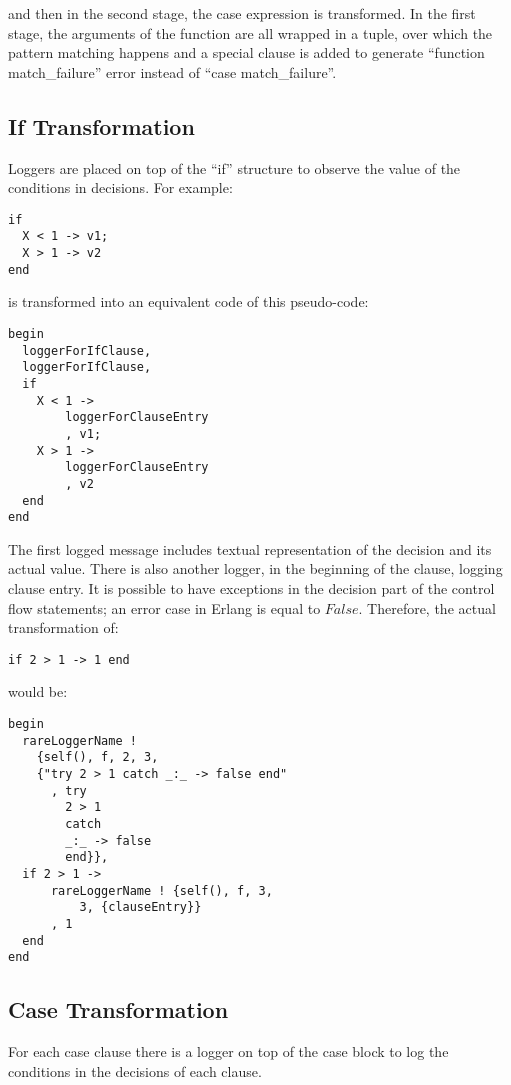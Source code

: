 \documentclass[12pt,a4paper]{report}
\begin{document}
and then in the second stage, the case expression is transformed. In the first stage, the arguments of the function are all wrapped in a tuple, over which the pattern matching happens and a special clause is added to generate ``function match\_failure'' error instead of ``case match\_failure''.

\subsection{If Transformation}
Loggers are placed on top of the ``if'' structure to observe the value of the conditions in decisions. For example:

\begin{lstlisting}
if 
  X < 1 -> v1;
  X > 1 -> v2
end 
\end{lstlisting}

is transformed into an equivalent code of this pseudo-code:

\begin{lstlisting}
begin
  loggerForIfClause,
  loggerForIfClause,  
  if 
    X < 1 ->
	    loggerForClauseEntry
	    , v1;
    X > 1 ->
	    loggerForClauseEntry
	    , v2
  end
end 
\end{lstlisting}

The first logged message includes textual representation of the decision and its actual value. There is also another logger, in the beginning of the clause, logging clause entry. It is possible to have exceptions in the decision part of the control flow statements; an error case in Erlang is equal to $False$. Therefore, the actual transformation of:

\begin{lstlisting}
if 2 > 1 -> 1 end
\end{lstlisting}

would be:

\begin{lstlisting}
begin
  rareLoggerName !
    {self(), f, 2, 3,
	{"try 2 > 1 catch _:_ -> false end"
	  , try 	
		2 > 1 
	    catch 
		_:_ -> false 
	    end}},
  if 2 > 1 ->
      rareLoggerName ! {self(), f, 3,
	      3, {clauseEntry}}
      , 1
  end
end 
\end{lstlisting}

\subsection{Case Transformation}
For each case clause there is a logger on top of the case block to log the conditions in the decisions of each clause.
 
\end{document}
